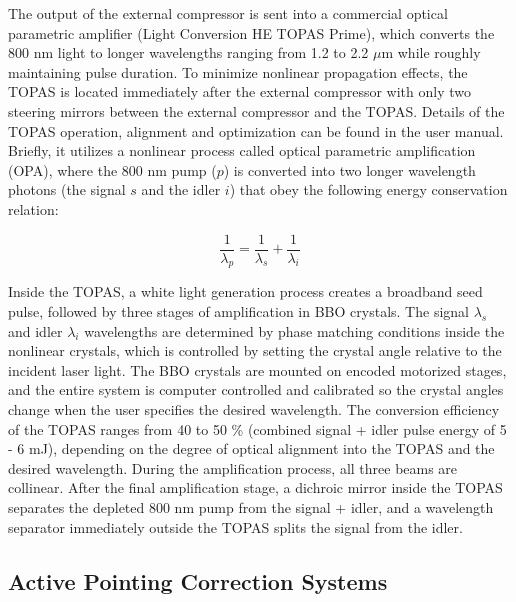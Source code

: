 The output of the external compressor is sent into a commercial optical parametric amplifier (Light Conversion HE TOPAS Prime), which converts the 800 nm light to longer wavelengths ranging from 1.2 to 2.2 $\mu$m while roughly maintaining pulse duration. To minimize nonlinear propagation effects, the TOPAS is located immediately after the external compressor with only two steering mirrors between the external compressor and the TOPAS. Details of the TOPAS operation, alignment and optimization can be found in the user manual. Briefly, it utilizes a nonlinear process called optical parametric amplification (OPA), where the 800 nm pump ($p$) is converted into two longer wavelength photons (the signal $s$ and the idler $i$) that obey the following energy conservation relation:

\begin{equation}
\frac{1}{\lambda_p} = \frac{1}{\lambda_s} + \frac{1}{\lambda_i}
\end{equation}

Inside the TOPAS, a white light generation process creates a broadband seed pulse, followed by three stages of amplification in BBO crystals. The signal $\lambda_s$ and idler $\lambda_i$ wavelengths are determined by phase matching conditions inside the nonlinear crystals, which is controlled by setting the crystal angle relative to the incident laser light. The BBO crystals are mounted on encoded motorized stages, and the entire system is computer controlled and calibrated so the crystal angles change when the user specifies the desired wavelength. The conversion efficiency of the TOPAS ranges from 40 to 50 \% (combined signal + idler pulse energy of 5 - 6 mJ), depending on the degree of optical alignment into the TOPAS and the desired wavelength. During the amplification process, all three beams are collinear. After the final amplification stage, a dichroic mirror inside the TOPAS separates the depleted 800 nm pump from the signal + idler, and a wavelength separator immediately outside the TOPAS splits the signal from the idler.

\subsection{Active Pointing Correction Systems}

